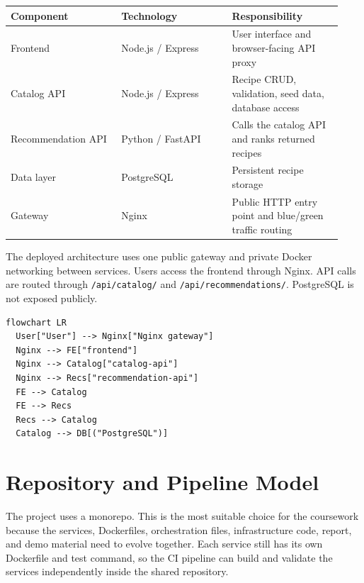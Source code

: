 \documentclass[11pt,a4paper]{article}
\begin{document}
\begin{longtable}{@{}>{\raggedright\arraybackslash}p{0.31\linewidth}>{\raggedright\arraybackslash}p{0.31\linewidth}>{\raggedright\arraybackslash}p{0.31\linewidth}@{}}
\toprule
\textbf{Component} & \textbf{Technology} & \textbf{Responsibility} \\
\midrule
\endhead
Frontend & Node.js / Express & User interface and browser-facing API proxy \\
Catalog API & Node.js / Express & Recipe CRUD, validation, seed data, database access \\
Recommendation API & Python / FastAPI & Calls the catalog API and ranks returned recipes \\
Data layer & PostgreSQL & Persistent recipe storage \\
Gateway & Nginx & Public HTTP entry point and blue/green traffic routing \\
\bottomrule
\end{longtable}

The deployed architecture uses one public gateway and private Docker networking between services. Users access the frontend through Nginx. API calls are routed through \texttt{/api/catalog/} and \texttt{/api/recommendations/}. PostgreSQL is not exposed publicly.

\begin{lstlisting}
flowchart LR
  User["User"] --> Nginx["Nginx gateway"]
  Nginx --> FE["frontend"]
  Nginx --> Catalog["catalog-api"]
  Nginx --> Recs["recommendation-api"]
  FE --> Catalog
  FE --> Recs
  Recs --> Catalog
  Catalog --> DB[("PostgreSQL")]
\end{lstlisting}

\section{Repository and Pipeline Model}

The project uses a monorepo. This is the most suitable choice for the coursework because the services, Dockerfiles, orchestration files, infrastructure code, report, and demo material need to evolve together. Each service still has its own Dockerfile and test command, so the CI pipeline can build and validate the services independently inside the shared repository.
\end{document}
